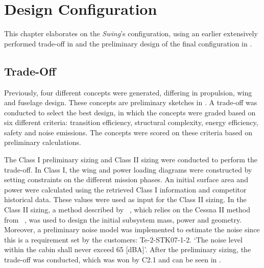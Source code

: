 \chapter{Design Configuration}
\label{ch:Configuration}
This chapter elaborates on the \textit{Swing}’s configuration, using an earlier extensively performed trade-off in  and the preliminary design of the final configuration in .


\section{Trade-Off}
\label{sec:tradeoff}
Previously, four different concepts were generated, differing in propulsion, wing and fuselage design.
These concepts are preliminary sketches in .
A trade-off was conducted to select the best design, in which the concepts were graded based on six different criteria: transition efficiency, structural complexity, energy efficiency, safety and noise emissions.
The concepts were scored on these criteria based on preliminary calculations.

The Class I preliminary sizing and Class II sizing were conducted to perform the trade-off.
In Class I, the wing and power loading diagrams were constructed by setting constraints on the different mission phases.
An initial surface area and power were calculated using the retrieved Class I information and competitor historical data.
These values were used as input for the Class II sizing.
In the Class II sizing, a method described by \citeauthor{Ugwueze_Sizing_Method}~\cite{Ugwueze_Sizing_Method}, which relies on the Cessna II method from \citeauthor{Roskam_Part_V}~\cite{Roskam_Part_V}, was used to design the initial subsystem mass, power and geometry.
Moreover, a preliminary noise model was implemented to estimate the noise since this is a requirement set by the customers: Te-2-STK07-1-2. 
\enquote*{The noise level within the cabin shall never exceed 65 [dBA]}.
After the preliminary sizing, the trade-off was conducted, which was won by C2.1 and can be seen in .

